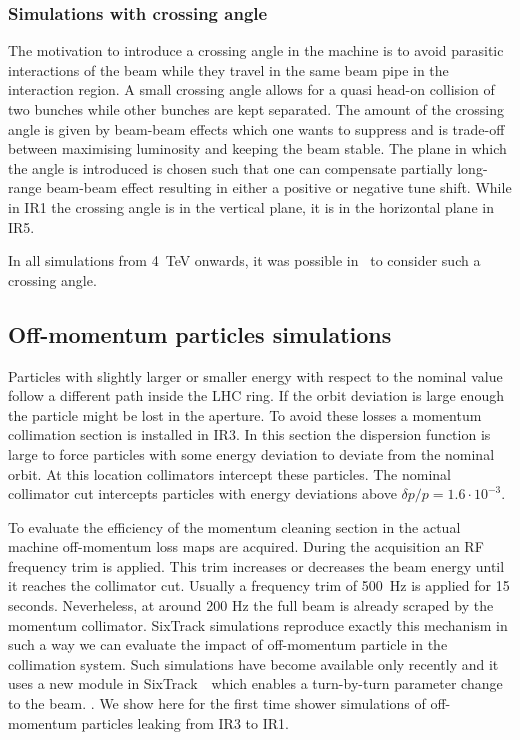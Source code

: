 \subsubsection{Simulations with crossing angle}
The motivation to introduce a crossing angle in the machine is to avoid parasitic interactions of the beam while they travel in the same beam pipe in the interaction region. A small crossing angle allows for a quasi head-on collision of two bunches while other bunches are kept separated. The amount of the crossing angle is given by beam-beam effects which one wants to suppress and is trade-off between maximising luminosity and keeping the beam stable. The plane in which the angle is introduced is chosen such that one can compensate partially long-range beam-beam effect resulting in either a positive or negative tune shift. While in IR1 the crossing angle is in the vertical plane, it is in the horizontal plane in IR5.

In all simulations from 4~TeV onwards, it was possible in \fluka~to consider such a crossing angle.

\subsection{Off-momentum particles simulations}
Particles with slightly larger or smaller energy with respect to the nominal value follow a different path inside the LHC ring. If the orbit deviation is large enough the particle might be lost in the aperture. To avoid these losses a momentum collimation section is installed in IR3. In this section the dispersion function is large to force particles with some energy deviation to deviate from the nominal orbit. At this location collimators intercept these particles. The nominal collimator cut intercepts particles with energy deviations above $\delta p/p = 1.6\cdot 10^{-3}$.

To evaluate the efficiency of the momentum cleaning section in the actual machine off-momentum loss maps are acquired. During the acquisition an RF frequency trim is applied. This trim increases or decreases the beam energy until it reaches the collimator cut. Usually a frequency trim of 500~Hz is applied for 15 seconds. Neverheless, at around 200 Hz the full beam is already scraped by the momentum collimator. SixTrack simulations reproduce exactly this mechanism in such a way we can evaluate the impact of off-momentum particle in the collimation system. Such simulations have become available only recently and it uses a new module in SixTrack~\cite{KyrreIpac2015}~which enables a turn-by-turn parameter change to the beam.  \cite{HectorsPaper}. 
We show here for the first time shower simulations of off-momentum particles leaking from IR3 to IR1. 

